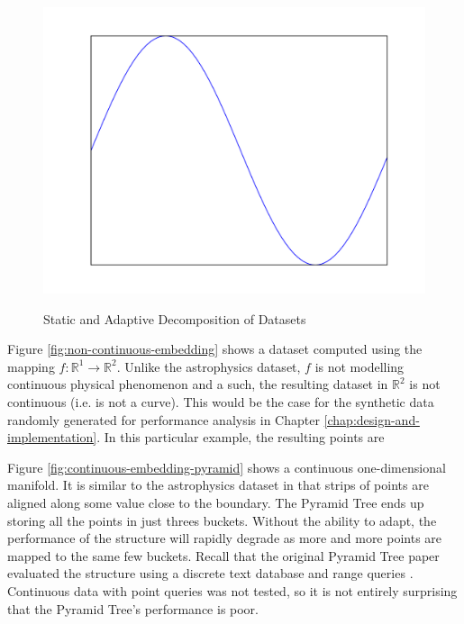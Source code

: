 \begin{figure}
\begin{center}
		\begin{subfloat}{%
			\includegraphics[scale=0.2]{figures/1d_manifold.pdf}%
		}
		\end{subfloat}
	\end{center}

	\caption{Static and Adaptive Decomposition of Datasets}
	\label{fig:static-adaptive-decomposition}
\end{figure}

Figure \ref{fig:non-continuous-embedding} shows a dataset computed using the mapping $f : \mathbb{R}^1 \rightarrow \mathbb{R}^2$. Unlike the astrophysics dataset, $f$ is not modelling continuous physical phenomenon and a such, the resulting dataset in $\mathbb{R}^2$ is not continuous (i.e. is not a curve). This would be the case for the synthetic data randomly generated for performance analysis in Chapter \ref{chap:design-and-implementation}. In this particular example, the resulting points are  

Figure \ref{fig:continuous-embedding-pyramid} shows a continuous one-dimensional manifold. It is similar to the astrophysics dataset in that strips of points are aligned along some value close to the boundary. The Pyramid Tree ends up storing all the points in just threes buckets. Without the ability to adapt, the performance of the structure will rapidly degrade as more and more points are mapped to the same few buckets. Recall that the original Pyramid Tree paper evaluated the structure using a discrete text database and range queries \cite{pyramid-tree}. Continuous data with point queries was not tested, so it is not entirely surprising that the Pyramid Tree's performance is poor.

